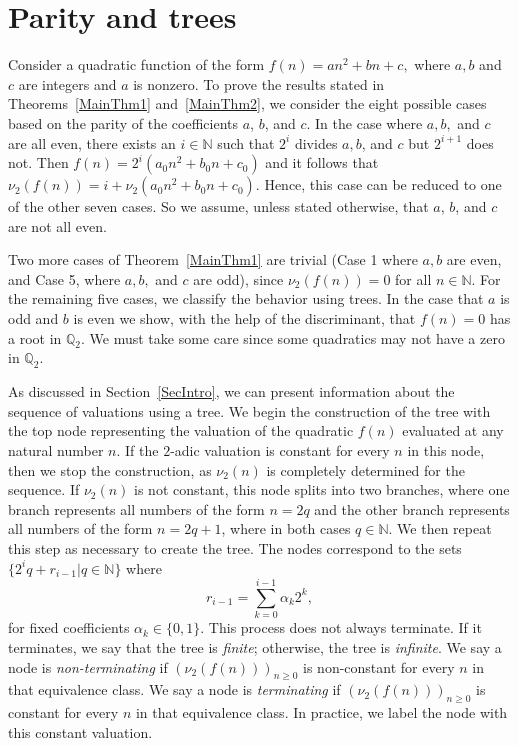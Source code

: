\documentclass[12pt]{article}
\begin{document}
\section{Parity and trees}\label{SecParityandTrees}

Consider a quadratic function of the form $f(n)=an^2+bn+c,$ where $a,b$ and $c$ are integers and $a$ is nonzero. To prove the results stated in Theorems~\ref{MainThm1} and~\ref{MainThm2}, we consider the eight possible cases based on the parity of the coefficients $a$, $b$, and $c$. In the case where $a,b,$ and $c$ are all even, there exists an $i\in\mathbb{N}$ such that $2^{i}$ divides $a,b$, and $c$ but $2^{i+1}$ does not. Then $f(n)=2^{i}(a_{0}n^{2}+b_{0}n+c_{0})$ and 
it follows that $\nu_{2}(f(n))=i+\nu_{2}(a_{0}n^{2}+b_{0}n+c_{0})$. Hence, this case can be reduced to one of the other seven cases. So we assume, unless stated otherwise, that $a$, $b$, and $c$ are not all even.

Two more cases of Theorem~\ref{MainThm1} are trivial (Case 1 where $a,b$ are even, and Case 5, where $a,b,$ and $c$ are odd), since $\nu_{2}(f(n))=0$ for all $n\in\mathbb{N}$. For the remaining five cases, we classify the behavior using trees. In the case that $a$ is odd and $b$ is even we show, with the help of the discriminant, that $f(n)=0$ has a root in $\mathbb{Q}_2$. We must take some care since some quadratics may not have a zero in $\mathbb{Q}_2$. 

As discussed in Section~\ref{SecIntro}, we can present information about the sequence of valuations using a tree. We begin the construction of the tree with the top node representing the valuation of the quadratic $f(n)$ evaluated at any natural number $n$. If the $2$-adic valuation is constant for every $n$ in this node, then we stop the construction, as $\nu_2(n)$ is completely determined for the sequence. If $\nu_2(n)$ is not constant, this node splits into two branches, where one branch represents all numbers of the form $n=2q$ and the other branch represents all numbers of the form $n=2q+1$, where in both cases $q\in\mathbb{N}$. We then repeat this step as necessary to create the tree. The nodes correspond to the sets  $\{2^{i}q+r_{i-1}|q\in\mathbb{N}\}$ where
\begin{equation}\label{2adicRemainder}
    r_{i-1}=\sum_{k=0}^{i-1}\alpha_{k}2^{k},
\end{equation}
for fixed coefficients $\alpha_{k}\in\{0,1\}$. This process does not always terminate. If it terminates, we say that the tree is \textit{finite}; otherwise, the tree is \textit{infinite}. We say a node is \textit{non-terminating} if $(\nu_{2}(f(n)))_{n\geq0}$ is non-constant for every $n$ in that equivalence class. We say a node is \textit{terminating} if $(\nu_{2}(f(n)))_{n\geq 0}$ is constant for every $n$ in that equivalence class. In practice, we label the node with this constant valuation.
\end{document}
